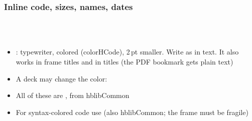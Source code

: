 \documentclass[aspectratio=169,10pt,compress]{beamer}
\begin{document}
\begin{frame}[t,fragile] \frametitle{Inline code, sizes, names, dates}

\begin{texcode}
        
  
    \cisOOO    \cisOOT    \hbTimeStamp    \hbTimeStampDraft
\end{texcode}

	\begin{center}
		 \quad {} \quad {}\\[2pt]
		 \quad {}\\[2pt]
		 \quad \cisOOO \quad \cisOOT \quad \hbTimeStamp \quad \hbTimeStampDraft
	\end{center}

	\begin{itemize}\small
		\item {}: typewriter, colored (colorHCode), 2\,pt smaller.
		Write \hCode{\textbackslash \_ \textbackslash \{ \textbackslash \}} as in text.
		It also works in frame titles and in  titles (the PDF bookmark gets plain text)
		\item A deck may change the color: 
		\item All of these are , from hblibCommon
		\item For syntax-colored code use  (also hblibCommon; the frame must be fragile)
	\end{itemize}
\end{frame}




\end{document}
